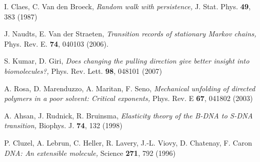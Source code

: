 \documentclass[doublecol,figures]{epl2}
\begin{document}
\begin{thebibliography}{99}
 I. Claes, C. Van den Broeck, {\sl Random walk with persistence,} J. Stat. Phys. {\bf 49}, 383 (1987)

 J. Naudts, E. Van der Straeten,
{\sl Transition records of stationary Markov chains,}
Phys. Rev. E. {\bf 74}, 040103 (2006).

 S. Kumar, D. Giri, {\sl Does changing the pulling direction
give
better insight into biomolecules?,} Phys. Rev. Lett. {\bf 98}, 048101 (2007)

 A. Rosa, D. Marenduzzo, A. Maritan, F. Seno, {\sl Mechanical
unfolding of directed polymers in a poor solvent: Critical exponents,} Phys.
Rev. E {\bf 67}, 041802 (2003)

 A. Ahsan, J. Rudnick, R. Bruinsma, {\sl Elasticity theory of
the B-DNA to S-DNA transition,} Biophys. J. {\bf 74}, 132 (1998)

 P. Cluzel, A. Lebrun, C. Heller, R. Lavery, J.-L. Viovy, D.
Chatenay, F. Caron {\sl DNA: An extensible molecule,} Science {\bf 271}, 792
(1996)

\end{thebibliography}
\end{document}
